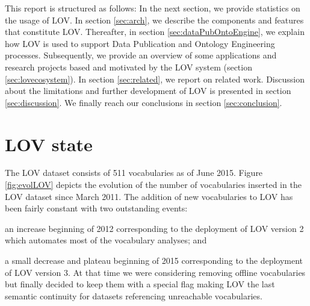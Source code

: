 \documentclass{iosart2c}
\begin{document}

This report is structured as follows: In the next section, we provide statistics on the usage of LOV. In section \ref{sec:arch}, we describe the components and features that constitute LOV. Thereafter,  in section \ref{sec:dataPubOntoEngine}, we explain how LOV is used to support Data Publication and Ontology Engineering processes. Subsequently, we provide an overview of some applications and research projects based and motivated by the LOV system (section \ref{sec:lovecosystem}). In section \ref{sec:related}, we report on related work. Discussion about the limitations and further development of LOV is presented in section \ref{sec:discussion}. We finally reach our conclusions in section \ref{sec:conclusion}.

\section{LOV state}\label{sec:state}
The LOV dataset consists of 511 vocabularies as of June 2015. Figure \ref{fig:evolLOV} depicts the evolution of the number of vocabularies inserted in the LOV dataset since March 2011. The addition of new vocabularies to LOV has been fairly constant with two outstanding events: 
\begin{inparaenum}[1)] 
	\item an increase beginning of 2012 corresponding to the deployment of LOV version 2 which automates most of the vocabulary analyses; and
	\item a small decrease and plateau beginning of 2015 corresponding to the deployment of LOV version 3. At that time we were considering  removing offline vocabularies but finally decided to keep them with a special flag making LOV the last semantic continuity for datasets referencing unreachable vocabularies.
\end{inparaenum} 
\end{document}
